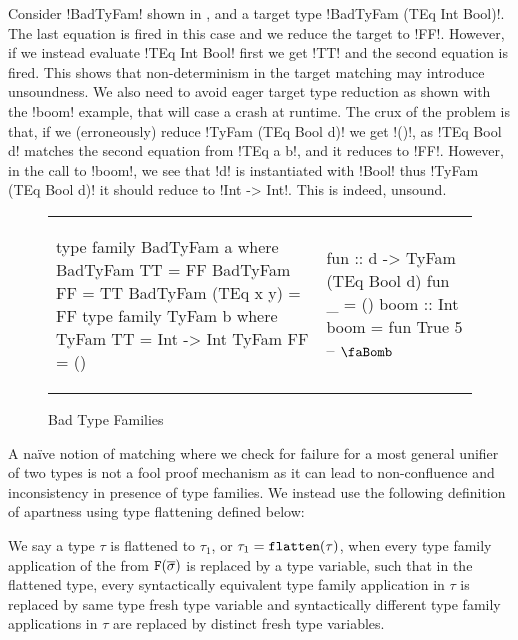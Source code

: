\documentclass[format=acmsmall,manuscript,review,screen,nonacm,margin=1in,11pt]{acmart}
\begin{document}
Consider !BadTyFam! shown in , and a target type
!BadTyFam (TEq Int Bool)!. The last equation is fired in this case and we reduce the target to !FF!.
However, if we instead evaluate !TEq Int Bool! first we get !TT! and the second equation is fired.
This shows that non-determinism in the target matching may introduce unsoundness.
We also need to avoid eager target type reduction as shown with the !boom! example,
that will case a crash at runtime. The crux of the problem is that, if we (erroneously) reduce
!TyFam (TEq Bool d)! we get !()!, as !TEq Bool d! matches the second equation from !TEq a b!,
and it reduces to !FF!. However, in the call to !boom!, we see that !d! is instantiated with !Bool!
thus !TyFam (TEq Bool d)! it should reduce to !Int -> Int!. This is indeed, unsound.
\begin{figure}[ht]
    \footnotesize
  \begin{tabular}{l l}
\begin{code}
type family BadTyFam a where
  BadTyFam TT        = FF
  BadTyFam FF        = TT
  BadTyFam (TEq x y) = FF
type family TyFam b where
  TyFam TT = Int -> Int
  TyFam FF = ()
\end{code}&%
\begin{code}
fun :: d -> TyFam (TEq Bool d)
fun _ = ()
boom :: Int
boom = fun True 5 -- $\text{\faBomb}$
\end{code}
  \end{tabular}
  \caption{Bad Type Families}
  \label{fig:closed-tf-bad}
\end{figure}
A na\"ive notion of matching where we check for failure for a most general unifier of two types
is not a fool proof mechanism as it can lead to non-confluence and inconsistency in presence of type families.
We instead use the following definition of apartness using type flattening defined below:
\begin{defn}\label{def:ctf-flatten}
  We say a type $\tau$ is flattened to $\tau_1$, or $\tau_1 = \texttt{flatten}(\tau)$, when every
  type family application of the from $\texttt{F}(\overline{\sigma})$ is replaced by a type variable,
  such that in the flattened type, every syntactically equivalent type family application
  in $\tau$ is replaced by same type fresh type variable and syntactically different type family applications in $\tau$
  are replaced by distinct fresh type variables.
\end{defn}
\end{document}
